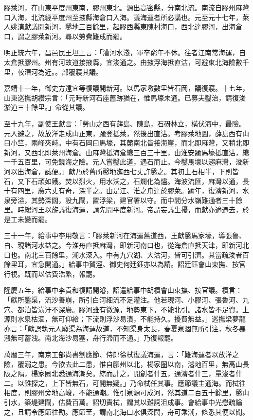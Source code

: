 膠萊河，在山東平度州東南，膠州東北。源出高密縣，分南北流。南流自膠州麻灣口入海，北流經平度州至掖縣海倉口入海。議海運者所必講也。元至元十七年，萊人姚演獻議開新河，鑿地三百餘里，起膠西縣東陳村海口，西北達膠河，出海倉口，謂之膠萊新河。尋以勞費難成而罷。

明正統六年，昌邑民王坦上言：「漕河水淺，軍卒窮年不休。往者江南常海運，自太倉抵膠州。州有河故道接掖縣，宜浚通之。由掖浮海抵直沽，可避東北海險數千里，較漕河為近。。部覆寢其議。

嘉靖十一年，御史方遠宜等復議開新河。以馬家墩數里皆石岡，議復寢。十七年，山東巡撫胡纘宗言：「元時新河石座舊跡猶在，惟馬壕未通。已募夫鑿治，請復浚淤道三十餘里。」命從其議。

至十九年，副使王獻言：「勞山之西有薛島、陳島，石砑林立，橫伏海中，最險。元人避之，故放洋走成山正東，踰登抵萊，然後出直沽。考膠萊地圖，薛島西有山曰小竺，兩峰夾峙。中有石岡曰馬壕，其麓南北皆接海崖，而北即麻灣，又稍北即新河，又西北即萊州海倉。由麻灣抵海倉纔三百三十里，由淮安踰馬壕抵直沽，纔一千五百里，可免鐃海之險。元人嘗鑿此道，遇石而止。今鑿馬壕以趨麻灣，浚新河以出海倉，誠便。」獻乃於舊所鑿地迤西七丈許鑿之。其初土石相半，下則皆石，又下石頑如鐵。焚以烈火，用水沃之，石爛化為燼。海波流匯，麻灣以通，長十有四里，廣六丈有奇，深半之。由是江、淮之舟達於膠萊。踰年，復濬新河，水泉旁溢，其勢深闊，設九閘，置浮梁，建官署以守。而中間分水嶺難通者三十餘里。時總河王以旂議復海運，請先開平度新河。帝謂妄議生擾，而獻亦適遷去，於是工未變而罷。

三十一年，給事中李用敬言：「膠萊新河在海運舊道西，王獻鑿馬家壕，導張魯、白、現諸河水益之。今淮舟直抵麻灣，即新河南口也，從海倉直抵天津，即新河北口也。南北三百餘里，潮水深入。中有九穴湖、大沽河，皆可引濟。其當疏浚者百餘里耳，宜急開通。」給事中賀涇、御史何廷鈺亦以為請。詔廷鈺會山東撫、按官行視。既而以估費浩繁，報罷。

隆慶五年，給事中李貴和復請開濬，詔遣給事中胡檟會山東撫、按官議。檟言：「獻所鑿渠，流沙善崩，所引白河細流不足灌注。他若現河、小膠河、張魯河、九穴、都泊皆潢汙不深廣。膠河雖有微源，地勢東下，不能北引。諸水皆不足資。上源則水泉枯涸，無可仰給；下流則浮沙易潰，不能持久。擾費無益。」巡撫梁夢龍亦言：「獻誤執元人廢渠為海運故道，不知渠身太長，春夏泉涸無所引注，秋冬暴漲無可蓄洩。南北海沙易塞，舟行滯而不通。」乃復報罷。

萬曆三年，南京工部尚書劉應節、侍郎徐栻復議海運，言：「難海運者以放洋之險，覆溺之患。今欲去此二患，惟自膠州以北，楊家圈以南，濬地百里，無高山長阪之隔，楊家圈北悉通海潮矣。綜而計之，開創者什五，通濬者什三，量浚者什二。以錐探之，上下皆無石，可開無疑。」乃命栻任其事。應節議主通海。而栻往相度，則膠州旁地高峻，不能通潮。惟引泉源可成河，然其道二百五十餘里，鑿山引水，築堤建閘，估費百萬。詔切責栻，謂其以難詞沮成事。會給事中光懋疏論之，且請令應節往勘。應節至，謂南北海口水俱深闊，舟可乘潮，條悉其便以聞。


